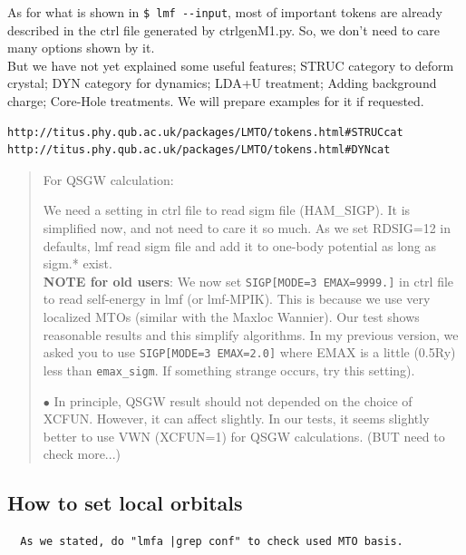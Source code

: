 \documentclass[a4paper,10pt,epsf,fleqn]{article}
\begin{document}
{As for what is shown in \verb+$ lmf --input+, most of important tokens are
already described in the ctrl file generated by ctrlgenM1.py.
So, we don't need to care many options shown by it.\\

But we have not yet explained some useful features;
STRUC category to deform crystal; DYN category for dynamics; LDA+U
treatment; Adding background charge; Core-Hole treatments.
We will prepare examples for it if requested.
\begin{verbatim}
http://titus.phy.qub.ac.uk/packages/LMTO/tokens.html#STRUCcat
http://titus.phy.qub.ac.uk/packages/LMTO/tokens.html#DYNcat
\end{verbatim}


\begin{quote}
For QSGW calculation:

We need a setting in ctrl file to read sigm file (HAM\_SIGP). 
It is simplified now, and not need to care it so much.
As we set RDSIG=12 in defaults, lmf read sigm file and add it to one-body
potential as long as sigm.* exist.\\

{\bf NOTE for old users}: We now set \verb+SIGP[MODE=3 EMAX=9999.]+
in ctrl file to read self-energy in lmf (or lmf-MPIK). 
This is because we use very localized MTOs (similar with the Maxloc Wannier).
Our test shows reasonable results and this simplify algorithms.
In my previous version, we asked you to use \verb+SIGP[MODE=3 EMAX=2.0]+
where EMAX is a little (0.5Ry) less than \verb+emax_sigm+. If something
strange occurs, try this setting).

$\bullet$ In principle, QSGW result should not depended on the choice of XCFUN.
However, it can affect slightly. In our tests, it seems slightly better
to use VWN (XCFUN=1) for QSGW calculations. (BUT need to check more...)

\end{quote}


\subsection{How to set local orbitals}
\begin{verbatim}
  As we stated, do "lmfa |grep conf" to check used MTO basis. 


\end{verbatim}}
\end{document}
